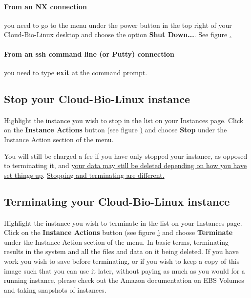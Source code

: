 \paragraph{From an NX connection} you need to go to the menu under the power button in the top right of your Cloud-Bio-Linux desktop and choose the option \textbf{Shut Down...}. See figure \href{fig:nxshutdown}.

\paragraph{From an ssh command line (or Putty) connection} you need to type \textbf{exit} at the command prompt.


\subsection{Stop your Cloud-Bio-Linux instance}

\paragraph{}Highlight the instance you wish to stop in the list on your Instances page. Click on the \textbf{Instance Actions} button (see figure \href{fig:instancesOptions}) and choose \textbf{Stop} under the Instance Action section of the menu. 

You will still be charged a fee if you have only stopped your instance, as opposed to terminating it, and 
\href{http://docs.amazonwebservices.com/AWSEC2/latest/UserGuide/index.html?Concepts\_BootFromEBS.html\#Stop\_Start} {your data may still be deleted depending on how you have set things up}. \href{http://support.rightscale.com/06-FAQs/FAQ\_0149\_-_What\%27s\_the\_difference\_between\_Terminating\_and\_Stopping\_an\_EC2\_Instance\%3F}{Stopping and terminating are different.}

\subsection{Terminating your Cloud-Bio-Linux instance}

\paragraph{}Highlight the instance you wish to terminate in the list on your Instances page. Click on the \textbf{Instance Actions} button (see figure \href{fig:instancesOptions}) and choose \textbf{Terminate} under the Instance Action section of the menu. In basic terms, terminating results in the system and all the files and data on it being deleted. If you have work you wish to save before terminating, or if you wish to keep a copy of this image such that you can use it later, without paying as much as you would for a running instance, please check out the Amazon documentation on EBS Volumes and taking snapshots of instances.



